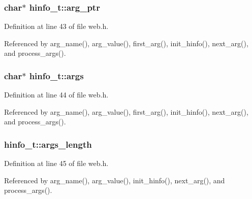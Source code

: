 \subsubsection[{\texorpdfstring{arg\+\_\+ptr}{arg_ptr}}]{\setlength{\rightskip}{0pt plus 5cm}char$\ast$ hinfo\+\_\+t\+::arg\+\_\+ptr}\hypertarget{structhinfo__t_a0d27c1b7d2730373f93342961b9cb18d}{}\label{structhinfo__t_a0d27c1b7d2730373f93342961b9cb18d}


Definition at line 43 of file web.\+h.



Referenced by arg\+\_\+name(), arg\+\_\+value(), first\+\_\+arg(), init\+\_\+hinfo(), next\+\_\+arg(), and process\+\_\+args().

\subsubsection[{\texorpdfstring{args}{args}}]{\setlength{\rightskip}{0pt plus 5cm}char$\ast$ hinfo\+\_\+t\+::args}\hypertarget{structhinfo__t_a62bf198b939a9d932bcac763ebc51443}{}\label{structhinfo__t_a62bf198b939a9d932bcac763ebc51443}


Definition at line 44 of file web.\+h.



Referenced by arg\+\_\+name(), arg\+\_\+value(), first\+\_\+arg(), init\+\_\+hinfo(), next\+\_\+arg(), and process\+\_\+args().

\subsubsection[{\texorpdfstring{args\+\_\+length}{args_length}}]{ hinfo\+\_\+t\+::args\+\_\+length}\hypertarget{structhinfo__t_a003130c9489dfe54a76df23a85fae62f}{}\label{structhinfo__t_a003130c9489dfe54a76df23a85fae62f}


Definition at line 45 of file web.\+h.



Referenced by arg\+\_\+name(), arg\+\_\+value(), init\+\_\+hinfo(), next\+\_\+arg(), and process\+\_\+args().

